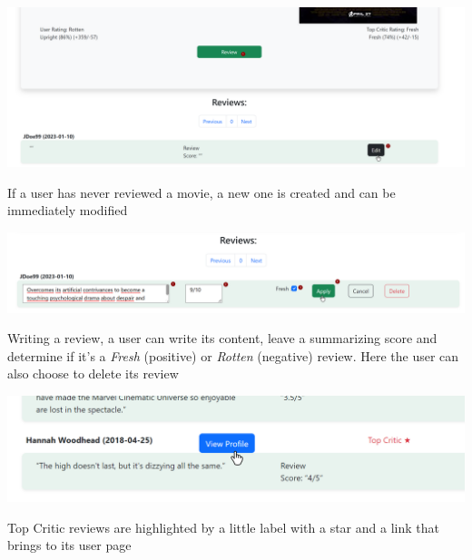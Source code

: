 \begin{center}
\includegraphics[scale=0.45]{../../../images/user_manual/new_review.png} 

\end{center}
\vspace{5pt}

If a user has never reviewed a movie, a new one is created and can be immediately modified

\begin{center}
\includegraphics[scale=0.45]{../../../images/user_manual/write_review.png}
\end{center}
\vspace{5pt}
 

Writing a review, a user can write its content, leave a summarizing score and determine if it's a \textit{Fresh} (positive) or \textit{Rotten} (negative) review. Here the user can also choose to delete its review

\begin{center}
\includegraphics[scale=0.45]{../../../images/user_manual/view_profile_of_top_critic.png} 
\end{center}
\vspace{5pt}

Top Critic reviews are highlighted by a little label with a star and a link that brings to its user page


